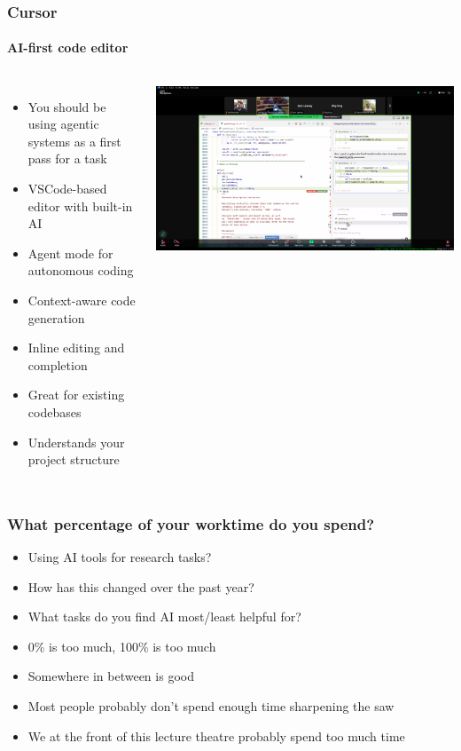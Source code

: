 \documentclass[aspectratio=169]{beamer}
\begin{document}
\begin{frame}
    \frametitle{Cursor}
    \framesubtitle{AI-first code editor}
    
    \begin{columns}
        \begin{itemize}
            \item You should be using agentic systems as a first pass for a task
            \item VSCode-based editor with built-in AI
            \item Agent mode for autonomous coding
            \item Context-aware code generation
            \item Inline editing and completion
            \item Great for existing codebases
            \item Understands your project structure
        \end{itemize}
        
        \includegraphics[width=\textwidth]{figures/cursor_screenshot.png}
    \end{columns}
\end{frame}

\begin{frame}
    \frametitle{What percentage of your worktime do you spend?}
    
    \begin{itemize}
        \item Using AI tools for research tasks?
        \item How has this changed over the past year?
        \item What tasks do you find AI most/least helpful for?
        \item 0\% is too much, 100\% is too much
        \item Somewhere in between is good
        \item Most people probably don't spend enough time sharpening the saw
        \item We at the front of this lecture theatre probably spend too much time
    \end{itemize}
\end{frame}
\end{document}
